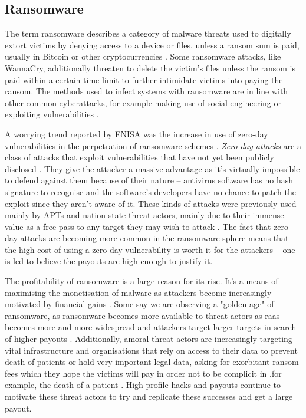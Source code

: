\subsection{Ransomware}
The term ransomware describes a category of malware threats used to digitally extort victims 
by denying access to a device or files, unless a ransom sum is paid, usually in Bitcoin or other 
cryptocurrencies \cite[p.~150]{ransomware_book}. Some ransomware attacks, like WannaCry, additionally 
threaten to delete the victim's files unless the ransom is paid within a certain time limit to further
intimidate victims into paying the ransom. The methods used to infect systems with ransomware are in line
with other common cyberattacks, for example making use of social engineering or exploiting vulnerabilities
\cite{nist_ransomware}.

A worrying trend reported by \acrshort{ENISA} was the increase in use of zero-day vulnerabilities in the
perpetration of ransomware schemes \cite{enisa_threat_landscape}. \emph{Zero-day attacks} are a class of
attacks that exploit vulnerabilities that have not yet been publicly disclosed \cite{zero-day}. They give the 
attacker a massive advantage as it's virtually impossible to defend against them because of their nature -- 
antivirus software has no hash signature to recognise and the software's developers have no chance to patch the
exploit since they aren't aware of it. These kinds of attacks were previously used mainly by \acrfull{APT}s 
and nation-state threat actors, mainly due to their immense value as a free pass to
any target they may wish to attack \cite{enisa_threat_landscape}. The fact that zero-day attacks are becoming more
common in the ransomware sphere means that the high cost of using a zero-day vulnerability is worth it for the 
attackers -- one is led to believe the payouts are high enough to justify it. 

The profitability of ransomware is a large reason for its rise. It's a means of maximising the monetisation of 
malware as attackers become increasingly motivated by financial gains \cite{ransomware-comprehensive, enisa_threat_landscape}.
Some say we are observing a "golden age" of ransomware, as ransomware becomes more available to threat actors
as \acrfull{raas} becomes more and more widespread and attackers target larger targets in search
of higher payouts \cite{enisa_threat_landscape}. Additionally, amoral threat actors are increasingly targeting
vital infrastructure and organisations that rely on access to their data to prevent death of patients
or hold very important legal data, asking for exorbitant ransom fees which they hope the victims will pay in order
not to be complicit in ,for example, the death of a patient \cite[p.~17-18]{morphisec_threat_landscape,
ransomware-book}. 
High profile hacks and payouts continue to motivate these threat actors to try and replicate these successes and 
get a large payout. 

